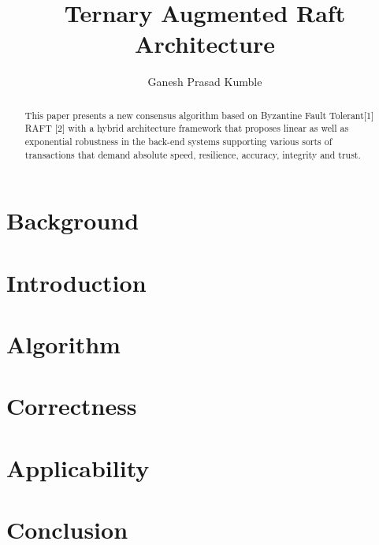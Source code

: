 \documentclass[]{article}
\title{Ternary Augmented Raft Architecture}
\author{Ganesh Prasad Kumble}
\begin{document}
\date{}
\maketitle

\begin{abstract}
This paper presents a new consensus algorithm based on Byzantine Fault Tolerant[1] RAFT [2] with a hybrid architecture framework that proposes linear as well as exponential robustness in the back-end systems supporting various sorts of transactions that demand absolute speed, resilience, accuracy, integrity and trust.
\end{abstract}

\section{Background}

\section{Introduction}

\section{Algorithm}

\section{Correctness}

\section{Applicability}

\section{Conclusion}
\end{document}
